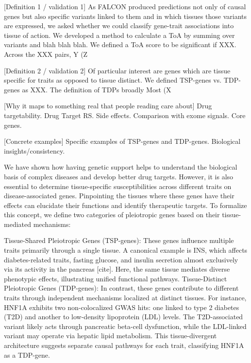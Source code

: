 [Definition 1 / validation 1] As FALCON produced predictions not only of causal genes but also specific variants linked to them and in which tissues those variants are expressed, we asked whether we could classify gene-trait associations into tissue of action. We developed a method to calculate a ToA by summing over variants and blah blah blah. We defined a ToA score to be significant if XXX. Across the XXX pairs, Y (Z%

[Definition 2 / validation 2] Of particular interest are genes which are tissue specific for traits as opposed to tissue distinct. We defined TSP-genes vs. TDP-genes as XXX. The definition of TDPs broadly Most (X%

[Why it maps to something real that people reading care about] Drug targetability. Drug Target RS. Side effects. Comparison with exome signals. Core genes.

[Concrete examples] Specific examples of TSP-genes and TDP-genes. Biological insights/consistency.

We have shown how having genetic support helps to understand the biological basis of complex diseases and develop better drug targets. However, it is also essential to determine tissue-specific susceptibilities across different traits on disease-associated genes. Pinpointing the tissues where these genes have their effects can elucidate their functions and identify therapeutic targets. To formalize this concept, we define two categories of pleiotropic genes based on their tissue-mediated mechanisms:

Tissue-Shared Pleiotropic Genes (TSP-genes): These genes influence multiple traits primarily through a single tissue. A canonical example is INS, which affects diabetes-related traits, fasting glucose, and insulin secretion almost exclusively via its activity in the pancreas [cite]. Here, the same tissue mediates diverse phenotypic effects, illustrating unified functional pathways. Tissue-Distinct Pleiotropic Genes (TDP-genes): In contrast, these genes contribute to different traits through independent mechanisms localized at distinct tissues. For instance, HNF1A exhibits two non-colocalized GWAS hits: one linked to type 2 diabetes (T2D) and another to low-density lipoprotein (LDL) levels. The T2D-associated variant likely acts through pancreatic beta-cell dysfunction, while the LDL-linked variant may operate via hepatic lipid metabolism. This tissue-divergent architecture suggests separate causal pathways for each trait, classifying HNF1A as a TDP-gene.

